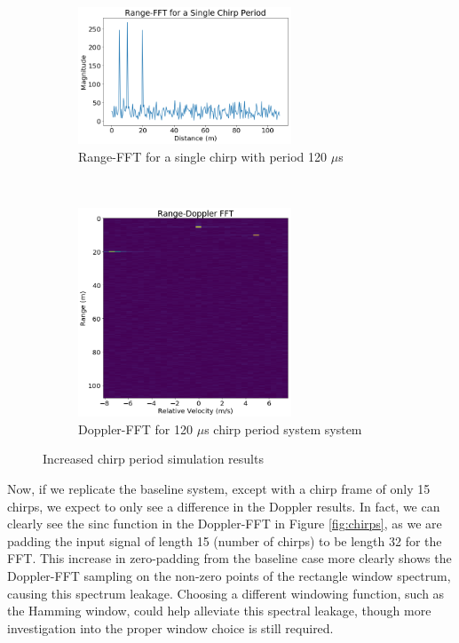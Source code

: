\begin{figure}[h]
	\centering 
	\begin{subfigure}[c]{0.5\textwidth}
		\centering
		\includegraphics[width=2.5in]{imgs/long_period_range}
		\caption{Range-FFT for a single chirp with period 120 $\mu$s}
	\end{subfigure}%
	~
	\begin{subfigure}[c]{0.5\textwidth}
		\centering
		\includegraphics[width=2.5in]{imgs/long_period_doppler}
		\caption{Doppler-FFT for 120 $\mu$s chirp period system
		system}
	\end{subfigure}
	\caption{Increased chirp period simulation results}
	\label{fig:period}
\end{figure}

Now, if we replicate the baseline system, except with a chirp frame of only 15
chirps, we expect to only see a difference in the Doppler results. In fact, we
can clearly see the sinc function in the Doppler-FFT in Figure \ref{fig:chirps}, as we
are padding the input signal of length 15 (number of chirps) to be length 32 for
the FFT. This increase in zero-padding from the baseline case more clearly shows
the Doppler-FFT sampling on the non-zero points of the rectangle window
spectrum, causing this spectrum leakage. Choosing a different windowing
function, such as the Hamming window, could help alleviate this spectral leakage,
though more investigation into the proper window choice is still required.

